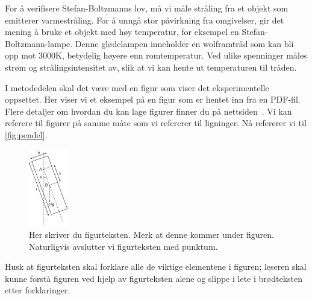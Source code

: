 For å verifisere Stefan-Boltzmanns lov, må vi måle stråling fra et objekt som emitterer varmestråling. For å unngå stor påvirkning fra omgivelser, gir det mening å bruke et objekt med høy temperatur, for eksempel en Stefan-Boltzmann-lampe. Denne glødelampen inneholder en wolframtråd som kan bli opp mot 3000K, betydelig høyere enn romtemperatur. Ved ulike spenninger måles strøm og strålingsintensitet av, slik at vi kan hente ut temperaturen til tråden.

I metodedelen skal det være med en figur som viser det eksperimentelle oppsettet. Her viser vi et eksempel på en figur som er hentet inn fra en PDF-fil. Flere detaljer om hvordan du kan lage figurer finner du på nettsiden~\cite{labside}. Vi kan referere til figurer på samme måte som vi refererer til ligninger. Nå refererer vi til \autoref{fig:pendel}.

\begin{figure}[tbp] 
\centering %
\includegraphics[width=0.15\textwidth]{pendel-oppdatert.pdf}
\caption{Her skriver du figurteksten. Merk at denne kommer under figuren. Naturligvis avslutter vi figurteksten med punktum.}
\label{fig:pendel} %
\end{figure}

Husk at figurteksten skal forklare alle de viktige elementene i figuren; leseren skal kunne forstå figuren ved hjelp av figurteksten alene og slippe i lete i brødteksten etter forklaringer. 


